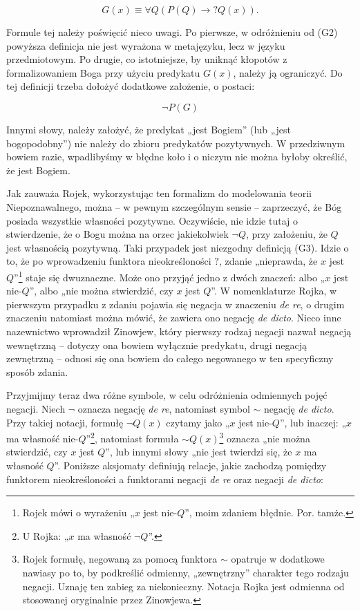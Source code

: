 \begin{equation}\tag{G3}
   G(x) \equiv \forall Q (P(Q) \to ?Q(x)).
\end{equation}



Formule tej należy poświęcić nieco uwagi. Po pierwsze, w odróżnieniu od
(G2) powyższa definicja nie jest wyrażona w metajęzyku, lecz w języku
przedmiotowym. Po drugie, co istotniejsze, by uniknąć kłopotów z
formalizowaniem Boga przy użyciu predykatu $G(x)$, należy ją ograniczyć.
Do tej definicji trzeba dołożyć dodatkowe założenie, o postaci:

\begin{equation}
    \neg P(G)
\end{equation}


Innymi słowy, należy założyć, że predykat „jest Bogiem” (lub „jest
bogopodobny”) nie należy do zbioru predykatów pozytywnych. W
przedziwnym bowiem razie, wpadlibyśmy w błędne koło i o niczym nie
można byłoby określić, że jest Bogiem.

Jak zauważa Rojek, wykorzystując ten formalizm do modelowania teorii
Niepoznawalnego, można -- w pewnym szczególnym sensie -- zaprzeczyć, że
Bóg posiada wszystkie własności pozytywne. Oczywiście, nie idzie tutaj
o stwierdzenie, że o Bogu można na orzec jakiekolwiek
$\neg Q$, przy założeniu, że $Q$ jest własnością pozytywną.
Taki przypadek jest niezgodny definicją (G3). Idzie o to, że po
wprowadzeniu funktora nieokreśloności $?$, zdanie „nieprawda, że $x$ jest
$Q$”\footnote{Rojek mówi o wyrażeniu „$x$ jest nie-$Q$”, moim zdaniem
błędnie. Por. tamże. } staje się dwuznaczne. Może ono przyjąć jedno
z dwóch znaczeń: albo „$x$ jest nie-$Q$”, albo „nie można stwierdzić, czy $x$
jest $Q$”. W nomenklaturze Rojka, w pierwszym przypadku z zdaniu pojawia
się negacja w znaczeniu \textit{de re}, o drugim znaczeniu natomiast
można mówić, że zawiera ono negację \textit{de dicto}. Nieco inne
nazewnictwo wprowadził Zinowjew, który pierwszy rodzaj negacji nazwał
negacją wewnętrzną -- dotyczy ona bowiem wyłącznie predykatu, drugi
negacją zewnętrzną -- odnosi się ona bowiem do całego negowanego w ten
specyficzny sposób zdania.

Przyjmijmy teraz dwa różne symbole, w celu odróżnienia odmiennych pojęć
negacji. Niech $\neg$ oznacza negację \textit{de re},
natomiast symbol $\sim$ negację \textit{de dicto}. Przy
takiej notacji, formułę $\neg Q(x)$ czytamy jako „$x$ jest
nie-$Q$”, lub  inaczej: „$x$ ma własność nie-$Q$”\footnote{U Rojka: „$x$ ma
własność $\neg Q$”. }, natomiast formuła
$\sim\! Q(x)$\footnote{Rojek formułę, negowaną za pomocą
funktora $\sim$ opatruje w dodatkowe nawiasy po to, by
podkreślić odmienny, „zewnętrzny” charakter tego rodzaju negacji.
Uznaję ten zabieg za niekonieczny. Notacja Rojka jest odmienna od
stosowanej oryginalnie przez Zinowjewa. } oznacza „nie można
stwierdzić, czy $x$ jest $Q$”, lub  innymi słowy „nie jest twierdzi się, że
$x$ ma własność $Q$”. Poniższe aksjomaty definiują relacje, jakie zachodzą
pomiędzy funktorem nieokreśloności a funktorami negacji \textit{de re}
oraz negacji \textit{de dicto}:

